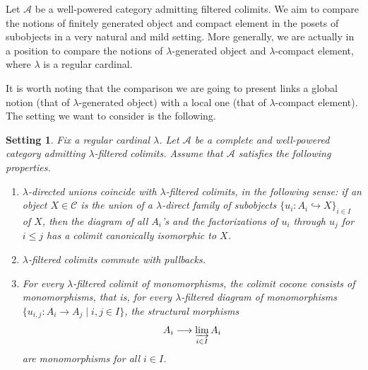 \documentclass{amsproc}
\theoremstyle{definition}
\theoremstyle{plain}
\newtheorem{Setting}[theorem]{Setting}
\theoremstyle{remark}
\numberwithin{equation}{section}
\newcommand{\Cal}[1]{{\mathcal #1}}
\begin{document}
Let $\Cal A$ be a well-powered category admitting filtered colimits. We aim to compare the notions of finitely generated object and compact element in the posets of subobjects in a very natural and mild setting. More generally, we are actually in a position to compare the notions of $\lambda$-generated object and $\lambda$-compact element, where $\lambda$ is a regular cardinal.

It is worth noting that the comparison we are going to present links a global notion (that of $\lambda$-generated object) with a local one (that of $\lambda$-compact element).
The setting we want to consider is the following.

\begin{Setting}\label{setting} Fix a regular cardinal $\lambda$. Let $\mathscr{A}$ be a complete and well-powered category admitting $\lambda$-filtered colimits. Assume that $\mathcal{A}$ satisfies the following properties.
\begin{enumerate}
    \item
    $\lambda$-directed unions coincide with $\lambda$-filtered colimits, in the following sense: 
    if an object $X \in \mathcal{C}$ is the union of a $\lambda$-direct family of subobjects $\{u_i : A_i \hookrightarrow X\}_{i \in I}$ of $X$, then the diagram of all $A_i$'s and the factorizations of $u_i$ through $u_j$ for $i\leq j$ has a colimit canonically isomorphic to $X$.
    \item
    $\lambda$-filtered colimits commute with pullbacks.
    \item 
    For every $\lambda$-filtered colimit of monomorphisms, the colimit cocone consists of monomorphisms, that is, for every $\lambda$-filtered diagram of monomorphisms $\{u_{i,j}\colon A_i\to A_j \mid i,j \in I\}$, the structural morphisms
    \[
    A_i \longrightarrow \varinjlim_{i \in I} A_i
    \]
    are monomorphisms for all $i \in I$.
\end{enumerate}
\end{Setting}
\end{document}
